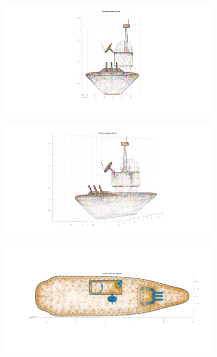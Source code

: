 \documentclass[11pt, oneside]{article}   	%
\begin{document}
\begin{figure}[H]
\begin{center}
\includegraphics[width=6in]{war_ship_2.pdf}
\end{center}
\caption{}
\label{war_ship_2}
\end{figure}


\begin{figure}[H]
\begin{center}
\includegraphics[width=6in]{war_ship_3.pdf}
\end{center}
\caption{}
\label{war_ship_3}
\end{figure}


\begin{figure}[H]
\begin{center}
\includegraphics[width=6in]{war_ship_4.pdf}
\end{center}
\caption{}
\label{war_ship_4}
\end{figure}
\end{document}
